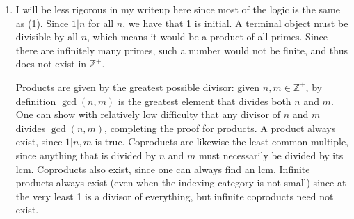 \documentclass[11pt, letterpaper]{article}
\begin{document}
\begin{enumerate}
		This indeed generalizes to arbitrary products. Since $\mathbb{Z} ^+$ is well-ordered, any subset $X\subseteq \mathbb{Z} ^+$ has a minimum and a maximum. Let $\mathcal{J} $ be a discrete category and $\left\{ n_j \right\}_{j\in \mathcal{J} } $ a $\mathcal{J} $-indexed collection. Write $n$ for the minimum over this set, which exists since all subsets of $\mathbb{Z} ^+$ have minimal elements by the well-ordering principle. This gives arrows $n\leq n_j$ for each $j$. Let $x$ be a cone for the relevant diagram, meaning $x\leq n_j$ for each $j$. More precisely, there is a diagram of solid arrows
		\[\begin{tikzcd}[row sep = 2.5em, column sep = 2.5em]
		 & n_j \\
		x\ar[ur] \ar[dashed, r]  & n\ar[u]
		\end{tikzcd}\]
		for each $n_j$. Since $n\in \left\{ x_j \right\}_{j\in \mathcal{J}}\implies  x\leq n$, there exists a unique dashed arrow as indicated, which renders the diagram commutative by uniqueness of arrows in poset categories. Therefore, $n$ is a product
		\[
			\min \left\{ n_j \right\}_{j\in \mathcal{J} }=\prod_{j\in \mathcal{J} } n_j
		.\]
		The dual argument shows that if the coproduct exists, then
		\[
			\max \left\{ n_j \right\}_{j\in \mathcal{J} } =\coprod_{j\in \mathcal{J} } n_j
		.\]
		However, the coproduct need not exist in the infinite case. Consider for example the collection $\mathbb{Z}^+=\left\{ n_j \right\}_{j\in \mathcal{J} }$. The coproduct would then be $\max \mathbb{Z} ^+$, which does not exist in $\mathbb{Z} ^+$.
	\item I will be less rigorous in my writeup here since most of the logic is the same as (1). Since $1|n$ for all $n$, we have that 1 is initial. A terminal object must be divisible by all $n$, which means it would be a product of all primes. Since there are infinitely many primes, such a number would not be finite, and thus does not exist in $\mathbb{Z} ^+$.

		Products are given by the greatest possible divisor: given $n,m\in\mathbb{Z} ^+$, by definition $\operatorname{gcd} (n,m)$ is the greatest element that divides both $n$ and $m$. One can show with relatively low difficulty that any divisor of $n$ and $m$ divides $\operatorname{gcd}(n,m)$, completing the proof for products. A product always exist, since $1|n,m$ is true. Coproducts are likewise the least common multiple, since anything that is divided by $n$ and $m$ must necessarily be divided by its lcm. Coproducts also exist, since one can always find an lcm. Infinite products always exist (even when the indexing category is not small) since at the very least 1 is a divisor of everything, but infinite coproducts need not exist.


\end{enumerate}
\end{document}
